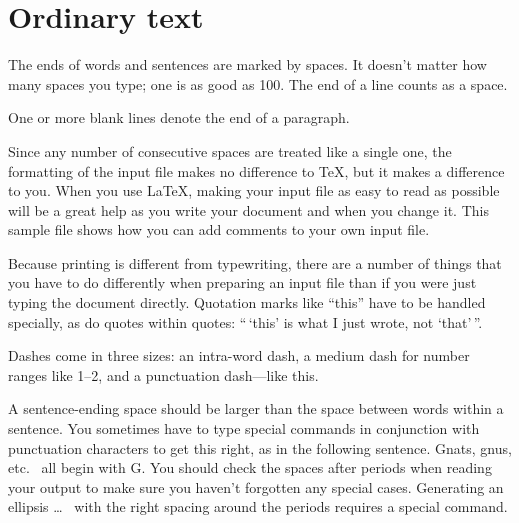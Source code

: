\documentclass[dvips,aoas,preprint]{imsart}
\numberwithin{equation}{section}
\theoremstyle{plain}
\begin{document}
\section{Ordinary text}

The ends  of words and sentences are marked
  by   spaces. It  doesn't matter how many
spaces    you type; one is as good as 100.  The
end of   a line counts as a space.

One   or more   blank lines denote the  end
of  a paragraph.

Since any number of consecutive spaces are treated like a single
one, the formatting of the input file makes no difference to
      \TeX,         %
but it makes a difference to you.
When you use
      \LaTeX,       %
making your input file as easy to read as possible
will be a great help as you write your document and when you
change it.  This sample file shows how you can add comments to
your own input file.

Because printing is different from typewriting, there are a
number of things that you have to do differently when preparing
an input file than if you were just typing the document directly.
Quotation marks like
       ``this''
have to be handled specially, as do quotes within quotes:
       ``\,`this'                  %
    is what I just
    wrote, not  `that'\,''.

Dashes come in three sizes: an
       intra-word
dash, a medium dash for number ranges like
       1--2,
and a punctuation
       dash---like
this.

A sentence-ending space should be larger than the space between words
within a sentence.  You sometimes have to type special commands in
conjunction with punctuation characters to get this right, as in the
following sentence.
       Gnats, gnus, etc.\    %
       all begin with G\@.   %
You should check the spaces after periods when reading your output to
make sure you haven't forgotten any special cases.
Generating an ellipsis
       \ldots\    %
with the right spacing around the periods
requires a special  command.
\end{document}
